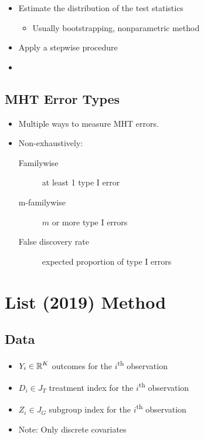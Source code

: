 \documentclass[10pt]{article}
\begin{document}
	\begin{itemize}
		\item Estimate the distribution of the test statistics
			\begin{itemize}
				\item Usually bootstrapping, nonparametric method 
			\end{itemize}
		\item Apply a stepwise procedure 
		\item \textcite{list_2019,white_2000,romano_2005}
	\end{itemize}

	\subsection[MHT Error Types]{MHT Error Types}

	\begin{itemize}
		\item Multiple ways to measure MHT errors.
		\item Non-exhaustively:
		\begin{description}
			\item[Familywise] at least 1 type I error
			\item[m-familywise] $m$ or more type I errors
			\item[False discovery rate] expected proportion of type I errors
		\end{description}
	\end{itemize}

	\section{List (2019) Method}

	\subsection{Data}

	\begin{itemize}
		\item $Y_i\in \operatorname{\mathbb{R}}^K$ outcomes for the $i$\textsuperscript{th} observation
		\item $D_i\in J_T$ treatment index for the $i$\textsuperscript{th} observation
		\item $Z_i\in J_G$ subgroup index for the $i$\textsuperscript{th} observation
		\item Note: Only discrete covariates
	\end{itemize}
\end{document}

